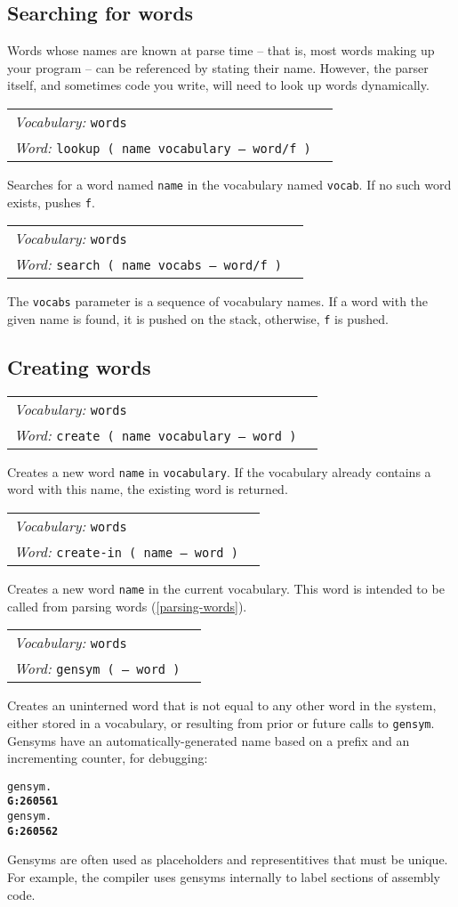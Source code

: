 \documentclass{book}
\newcommand{\vocabulary}[1]{\emph{Vocabulary:} \texttt{#1}&\\}
\newcommand{\ordinaryword}[2]{\index{\texttt{#1}}\emph{Word:} \texttt{#2}&\\}
\newcommand{\wordtable}[1]{


\begin{tabularx}{12cm}{lX}
\hline
#1
\hline
\end{tabularx}

}
\begin{document}
\subsection{Searching for words}

Words whose names are known at parse time -- that is, most words making up your program -- can be referenced by stating their name. However, the parser itself, and sometimes code you write, will need to look up words dynamically.
\wordtable{
\vocabulary{words}
\ordinaryword{lookup}{lookup ( name vocabulary -- word/f )}

}
Searches for a word named \verb|name| in the vocabulary named \verb|vocab|. If no such word exists, pushes \texttt{f}.
\wordtable{
\vocabulary{words}
\ordinaryword{search}{search ( name vocabs -- word/f )}

}
The \texttt{vocabs} parameter is a sequence of vocabulary names. If a word with the given name is found, it is pushed on the stack, otherwise, \texttt{f} is pushed.

\subsection{Creating words}\label{creating-words}

\wordtable{
\vocabulary{words}
\ordinaryword{create}{create ( name vocabulary -- word )}

}
Creates a new word \texttt{name} in \texttt{vocabulary}. If the vocabulary already contains a word with this name, the existing word is returned.
\wordtable{
\vocabulary{words}
\ordinaryword{create-in}{create-in ( name -- word )}

}
Creates a new word \texttt{name} in the current vocabulary. This word is intended to be called from parsing words (\ref{parsing-words}).

\newcommand{\uninternedglos}{
}
\uninternedglos

\wordtable{
\vocabulary{words}
\ordinaryword{gensym}{gensym ( -- word )}
}
Creates an uninterned word that is not equal to any other word in the system, either stored in a vocabulary, or resulting from prior or future calls to \verb|gensym|. Gensyms have an automatically-generated name based on a prefix and an incrementing counter, for debugging:
\begin{alltt}
  gensym .
\textbf{G:260561}
  gensym .
\textbf{G:260562}
\end{alltt}
Gensyms are often used as placeholders and representitives that must be unique. For example, the compiler uses gensyms internally to label sections of assembly code.
\end{document}
